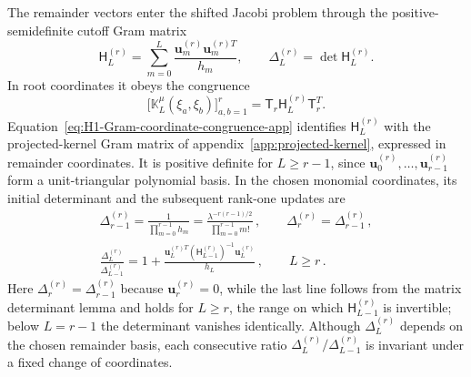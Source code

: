 \documentclass[a4paper,11pt]{article}
\theoremstyle{definition}
\theoremstyle{remark}
\begin{document}
The remainder vectors enter the shifted Jacobi problem through the positive-semidefinite cutoff Gram matrix
\begin{equation}
   \mathsf H_L^{(r)}
   =\sum_{m=0}^{L}\frac{\mathbf u_m^{(r)}
      \mathbf u_m^{(r)T}}{h_m},
   \qquad
   \Delta_L^{(r)}=\det\mathsf H_L^{(r)}.
   \label{eq:H1-remainder-Gram-app}
\end{equation}
In root coordinates it obeys the congruence
\begin{equation}
   \bigl[\mathbb K_L^\mu(\xi_a,\xi_b)\bigr]_{a,b=1}^{r}
   =\mathsf T_r\mathsf H_L^{(r)}\mathsf T_r^T.
   \label{eq:H1-Gram-coordinate-congruence-app}
\end{equation}
Equation~\eqref{eq:H1-Gram-coordinate-congruence-app} identifies $\mathsf H_L^{(r)}$ with the projected-kernel Gram matrix of appendix~\ref{app:projected-kernel}, expressed in remainder coordinates. It is positive definite for $L\ge r-1$, since $\mathbf u_0^{(r)},\ldots,\mathbf u_{r-1}^{(r)}$ form a unit-triangular polynomial basis. In the chosen monomial coordinates, its initial determinant and the subsequent rank-one updates are 
\begin{equation}
\begin{gathered}
   \Delta_{r-1}^{(r)}
   =\frac{1}{\prod_{m=0}^{r-1}h_m}
   =\frac{\lambda^{-r(r-1)/2}}{\prod_{m=0}^{r-1}m!}\,,
   \qquad
   \Delta_r^{(r)}=\Delta_{r-1}^{(r)}\,,\\
   \frac{\Delta_L^{(r)}}{\Delta_{L-1}^{(r)}}
   =1+\frac{\mathbf u_L^{(r)T}
      (\mathsf H_{L-1}^{(r)})^{-1}\mathbf u_L^{(r)}}{h_L}\,,
   \qquad L\ge r \,.
\end{gathered}
   \label{eq:H1-Delta-update-app}
\end{equation}
Here $\Delta_r^{(r)}=\Delta_{r-1}^{(r)}$ because $\mathbf u_r^{(r)}=0$, while the last line follows from the matrix determinant lemma and holds for $L\ge r$, the range on which $\mathsf H_{L-1}^{(r)}$ is invertible; below $L=r-1$ the determinant vanishes identically. Although $\Delta_L^{(r)}$ depends on the chosen remainder basis, each consecutive ratio $\Delta_L^{(r)}/\Delta_{L-1}^{(r)}$ is invariant under a fixed change of coordinates.
\end{document}
